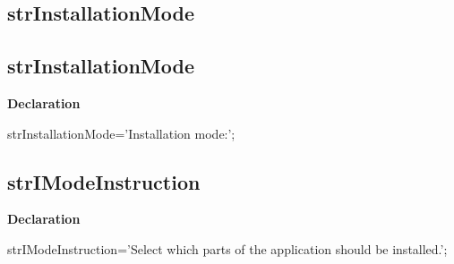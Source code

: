 \documentclass{report}
\newif\ifpdf
\begin{document}
\subsection*{\large{\textbf{strInstallationMode}}\normalsize\hspace{1ex}\hrulefill}
\else
\subsection*{strInstallationMode}
\fi
\label{trstrings-strInstallationMode}
\begin{list}{}{
\setlength{\itemindent}{0cm}
\setlength{\listparindent}{0cm}
\setlength{\leftmargin}{\evensidemargin}
\addtolength{\leftmargin}{\tmplength}
\settowidth{\labelsep}{X}
\addtolength{\leftmargin}{\labelsep}
\setlength{\labelwidth}{\tmplength}
}
\item[\textbf{Declaration}\hfill]
\ifpdf
\begin{flushleft}
\fi
\begin{ttfamily}
strInstallationMode='Installation mode:';\end{ttfamily}

\ifpdf
\end{flushleft}
\fi

\end{list}
\ifpdf
\subsection*{\large{\textbf{strIModeInstruction}}\normalsize\hspace{1ex}\hrulefill}
\else
\subsection*{strIModeInstruction}
\fi
\label{trstrings-strIModeInstruction}
\begin{list}{}{
\setlength{\itemindent}{0cm}
\setlength{\listparindent}{0cm}
\setlength{\leftmargin}{\evensidemargin}
\addtolength{\leftmargin}{\tmplength}
\settowidth{\labelsep}{X}
\addtolength{\leftmargin}{\labelsep}
\setlength{\labelwidth}{\tmplength}
}
\item[\textbf{Declaration}\hfill]
\ifpdf
\begin{flushleft}
\fi
\begin{ttfamily}
strIModeInstruction='Select which parts of the application should be installed.';\end{ttfamily}

\ifpdf
\end{flushleft}
\fi

\end{list}
\ifpdf
\end{document}
